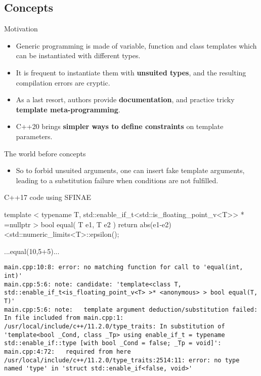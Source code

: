 \subsection[concepts]{Concepts}

\begin{frame}[fragile]
  \begin{block}{Motivation}
    \begin{itemize}
    \item Generic programming is made of variable, function and class templates which can be instantiated with different types.
    \item It is frequent to instantiate them with \textbf{unsuited types}, and the resulting compilation errors are cryptic.
    \item As a last resort, authors provide \textbf{documentation}, and practice tricky \textbf{template meta-programming}.
    \item C++20 brings \textbf{simpler ways to define constraints} on template parameters.
    \end{itemize}
  \end{block}
\end{frame}

\begin{frame}[fragile]
  \begin{block}{The world before concepts}
    \begin{itemize}
    \item So to forbid unsuited arguments, one can insert fake template arguments,
    leading to a substitution failure when conditions are not fulfilled.
    \end{itemize}
  \end{block}
  \begin{exampleblock}{C++17 code using SFINAE}
    \scriptsize
    \begin{cppcode*}{}
    template
    < typename T, std::enable_if_t<std::is_floating_point_v<T>> * =nullptr >
    bool equal( T e1, T e2 )
    { return abs(e1-e2)<std::numeric_limits<T>::epsilon(); }

    ...equal(10,5+5)...
    \end{cppcode*}
    \tiny
    \begin{verbatim}
main.cpp:10:8: error: no matching function for call to 'equal(int, int)'
main.cpp:5:6: note: candidate: 'template<class T, std::enable_if_t<is_floating_point_v<T> >* <anonymous> > bool equal(T, T)'
main.cpp:5:6: note:   template argument deduction/substitution failed:
In file included from main.cpp:1:
/usr/local/include/c++/11.2.0/type_traits: In substitution of 'template<bool _Cond, class _Tp> using enable_if_t = typename std::enable_if::type [with bool _Cond = false; _Tp = void]':
main.cpp:4:72:   required from here
/usr/local/include/c++/11.2.0/type_traits:2514:11: error: no type named 'type' in 'struct std::enable_if<false, void>'
    \end{verbatim}
  \end{exampleblock}
\end{frame}


